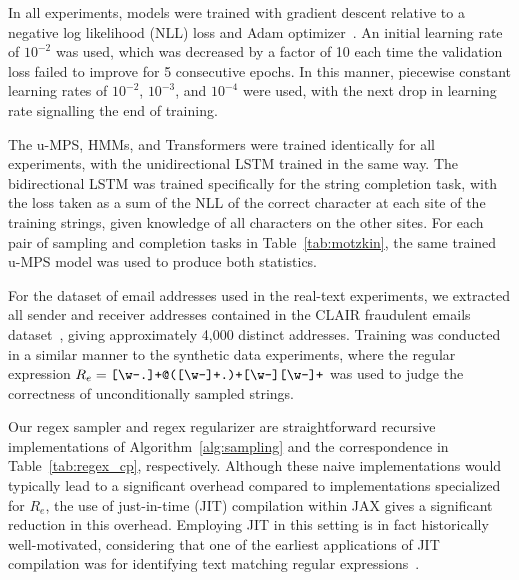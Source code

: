 \documentclass[twoside]{article}
\begin{document}
In all experiments, models were trained with gradient descent relative to a negative log likelihood (NLL) loss and Adam optimizer~\citep{kingma2015}. An initial learning rate of $10^{-2}$ was used, which was decreased by a factor of 10 each time the validation loss failed to improve for 5 consecutive epochs. In this manner, piecewise constant learning rates of $10^{-2}$, $10^{-3}$, and $10^{-4}$ were used, with the next drop in learning rate signalling the end of training.

The u-MPS, HMMs, and Transformers were trained identically for all experiments, with the unidirectional LSTM trained in the same way. The bidirectional LSTM was trained specifically for the string completion task, with the loss taken as a sum of the NLL of the correct character at each site of the training strings, given knowledge of all characters on the other sites. For each pair of sampling and completion tasks in Table~\ref{tab:motzkin}, 
the same trained u-MPS model was used to produce both statistics.

For the dataset of email addresses used in the real-text experiments, we extracted all sender and receiver addresses contained in the CLAIR fraudulent emails dataset~\citep{radev2008}, giving approximately 4,000 distinct addresses. Training was conducted in a similar manner to the synthetic data experiments, where the regular expression $R_{e} = \verb![\w-.]+@([\w-]+.)+[\w-][\w-]+!$ was used to judge the correctness of unconditionally sampled strings.

Our regex sampler and regex regularizer are straightforward recursive implementations of Algorithm~\ref{alg:sampling} and the correspondence in Table~\ref{tab:regex_cp}, respectively. Although these naive implementations would typically lead to a significant overhead compared to implementations specialized for $R_e$, the use of just-in-time (JIT) compilation within JAX gives a significant reduction in this overhead. Employing JIT in this setting is in fact historically well-motivated, considering that one of the earliest applications of JIT compilation was for identifying text matching regular expressions~\citep{thompson1968}. 

% 
% 

\end{document}
